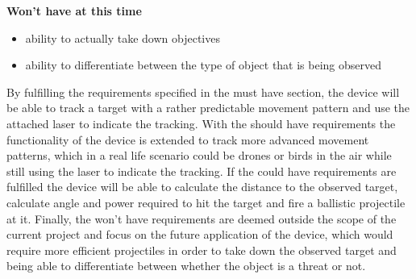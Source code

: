 \textbf{Won't have at this time}
\begin{itemize}
\item ability to actually take down objectives
\item ability to differentiate between the type of object that is being observed
\end{itemize}

By fulfilling the requirements specified in the must have section, the device will be able to track a target with a rather predictable movement pattern and use the attached laser to indicate the tracking. 
With the should have requirements the functionality of the device is extended to track more advanced movement patterns, which in a real life scenario could be drones or birds in the air while still using the laser to indicate the tracking.
If the could have requirements are fulfilled the device will be able to calculate the distance to the observed target, calculate angle and power required to hit the target and fire a ballistic projectile at it.
Finally, the won't have requirements are deemed outside the scope of the current project and focus on the future application of the device, which would require more efficient projectiles in order to take down the observed target and being able to differentiate between whether the object is a threat or not.